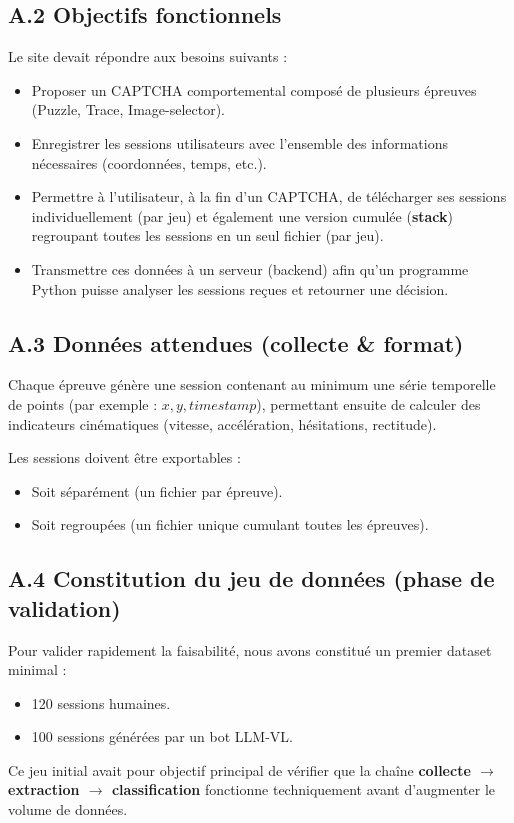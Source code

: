 \documentclass[a4paper, 12pt, twoside]{article}
\begin{document}
\subsection*{A.2 Objectifs fonctionnels}
Le site devait répondre aux besoins suivants :
\begin{itemize}
    \item Proposer un CAPTCHA comportemental composé de plusieurs épreuves (Puzzle, Trace, Image-selector).
    \item Enregistrer les sessions utilisateurs avec l'ensemble des informations nécessaires (coordonnées, temps, etc.).
    \item Permettre à l'utilisateur, à la fin d'un CAPTCHA, de télécharger ses sessions individuellement (par jeu) et également une version cumulée (\textbf{stack}) regroupant toutes les sessions en un seul fichier (par jeu).
    \item Transmettre ces données à un serveur (backend) afin qu'un programme Python puisse analyser les sessions reçues et retourner une décision.
\end{itemize}

\subsection*{A.3 Données attendues (collecte \& format)}
Chaque épreuve génère une session contenant au minimum une série temporelle de points (par exemple : $x, y, timestamp$), permettant ensuite de calculer des indicateurs cinématiques (vitesse, accélération, hésitations, rectitude).

Les sessions doivent être exportables :
\begin{itemize}
    \item Soit séparément (un fichier par épreuve).
    \item Soit regroupées (un fichier unique cumulant toutes les épreuves).
\end{itemize}

\subsection*{A.4 Constitution du jeu de données (phase de validation)}
Pour valider rapidement la faisabilité, nous avons constitué un premier dataset minimal :
\begin{itemize}
    \item 120 sessions humaines.
    \item 100 sessions générées par un bot LLM-VL.
\end{itemize}
Ce jeu initial avait pour objectif principal de vérifier que la chaîne \textbf{collecte $\rightarrow$ extraction $\rightarrow$ classification} fonctionne techniquement avant d'augmenter le volume de données.
\end{document}
